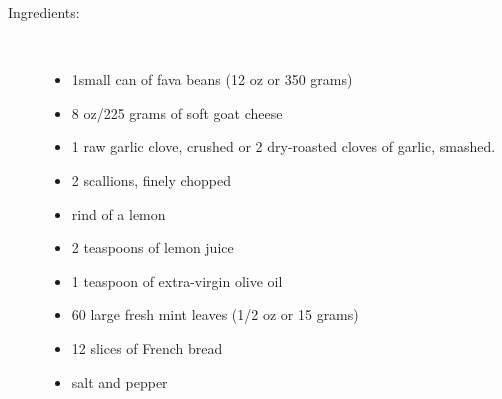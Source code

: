 \documentclass[11pt,letterpaper]{article}
\begin{document}
\begin{description}

\item[Ingredients:]\ \\
	\begin{itemize}
	\item 1small can of fava beans (12 oz or 350 grams)
	\item 8 oz/225 grams of soft goat cheese
	\item 1 raw garlic clove, crushed or 2 dry-roasted cloves of garlic, smashed.
	\item 2 scallions, finely chopped
	\item rind of a lemon
	\item 2 teaspoons of lemon juice
	\item 1 teaspoon of extra-virgin olive oil
	\item 60 large fresh mint leaves (1/2 oz or 15 grams)
	\item 12 slices of French bread
	\item salt and pepper
	\end{itemize}


\end{description}
\end{document}
